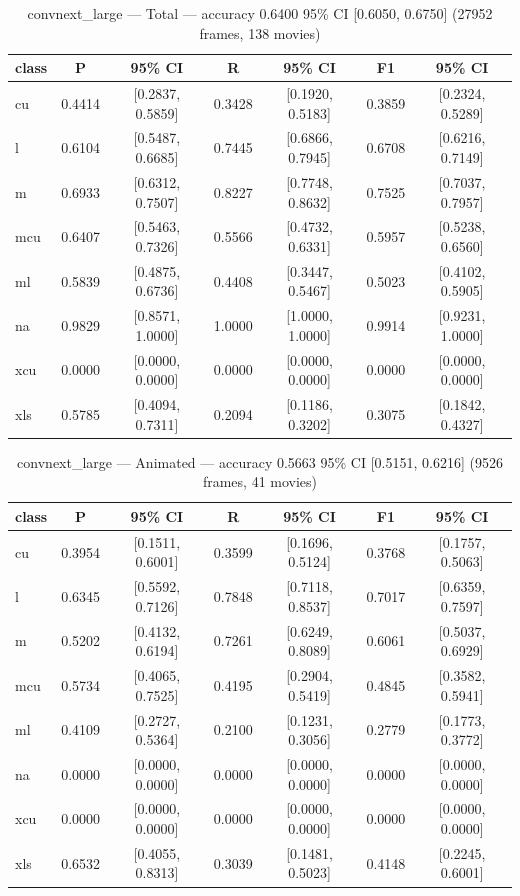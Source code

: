 \begin{table}[htbp]
\centering
\caption{convnext\_large — Total — accuracy 0.6400 95\% CI [0.6050, 0.6750] (27952 frames, 138 movies)}
\label{tab:convnext-large-total}
\begin{tabular}{lcccccc}
\toprule
class & P & 95\% CI & R & 95\% CI & F1 & 95\% CI \\
\midrule
cu & 0.4414 & [0.2837, 0.5859] & 0.3428 & [0.1920, 0.5183] & 0.3859 & [0.2324, 0.5289] \\
l & 0.6104 & [0.5487, 0.6685] & 0.7445 & [0.6866, 0.7945] & 0.6708 & [0.6216, 0.7149] \\
m & 0.6933 & [0.6312, 0.7507] & 0.8227 & [0.7748, 0.8632] & 0.7525 & [0.7037, 0.7957] \\
mcu & 0.6407 & [0.5463, 0.7326] & 0.5566 & [0.4732, 0.6331] & 0.5957 & [0.5238, 0.6560] \\
ml & 0.5839 & [0.4875, 0.6736] & 0.4408 & [0.3447, 0.5467] & 0.5023 & [0.4102, 0.5905] \\
na & 0.9829 & [0.8571, 1.0000] & 1.0000 & [1.0000, 1.0000] & 0.9914 & [0.9231, 1.0000] \\
xcu & 0.0000 & [0.0000, 0.0000] & 0.0000 & [0.0000, 0.0000] & 0.0000 & [0.0000, 0.0000] \\
xls & 0.5785 & [0.4094, 0.7311] & 0.2094 & [0.1186, 0.3202] & 0.3075 & [0.1842, 0.4327] \\
\bottomrule
\end{tabular}
\end{table}

\begin{table}[htbp]
\centering
\caption{convnext\_large — Animated — accuracy 0.5663 95\% CI [0.5151, 0.6216] (9526 frames, 41 movies)}
\label{tab:convnext-large-animated}
\begin{tabular}{lcccccc}
\toprule
class & P & 95\% CI & R & 95\% CI & F1 & 95\% CI \\
\midrule
cu & 0.3954 & [0.1511, 0.6001] & 0.3599 & [0.1696, 0.5124] & 0.3768 & [0.1757, 0.5063] \\
l & 0.6345 & [0.5592, 0.7126] & 0.7848 & [0.7118, 0.8537] & 0.7017 & [0.6359, 0.7597] \\
m & 0.5202 & [0.4132, 0.6194] & 0.7261 & [0.6249, 0.8089] & 0.6061 & [0.5037, 0.6929] \\
mcu & 0.5734 & [0.4065, 0.7525] & 0.4195 & [0.2904, 0.5419] & 0.4845 & [0.3582, 0.5941] \\
ml & 0.4109 & [0.2727, 0.5364] & 0.2100 & [0.1231, 0.3056] & 0.2779 & [0.1773, 0.3772] \\
na & 0.0000 & [0.0000, 0.0000] & 0.0000 & [0.0000, 0.0000] & 0.0000 & [0.0000, 0.0000] \\
xcu & 0.0000 & [0.0000, 0.0000] & 0.0000 & [0.0000, 0.0000] & 0.0000 & [0.0000, 0.0000] \\
xls & 0.6532 & [0.4055, 0.8313] & 0.3039 & [0.1481, 0.5023] & 0.4148 & [0.2245, 0.6001] \\
\bottomrule
\end{tabular}
\end{table}

